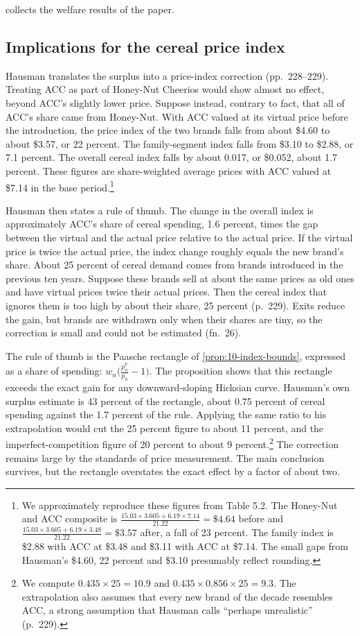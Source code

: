  collects the welfare results of the paper.

\subsection{Implications for the cereal price index}\label{sec:10-hausman-index}

Hausman translates the surplus into a price-index correction (pp.~228--229). Treating ACC as part of
Honey-Nut Cheerios would show almost no effect, beyond ACC's slightly lower price. Suppose instead, contrary
to fact, that all of ACC's share came from Honey-Nut. With ACC valued at its virtual price before
the introduction, the price index of the two brands falls from about \$4.60 to about \$3.57, or 22 percent. The
family-segment index falls from \$3.10 to \$2.88, or 7.1 percent. The overall cereal index falls by about
0.017, or \$0.052, about 1.7 percent. These figures are share-weighted average prices with ACC valued at
\$7.14 in the base period.\footnote{We approximately reproduce these figures from Table 5.2. The Honey-Nut and
ACC composite is $\frac{15.03 \times 3.605 + 6.19 \times 7.14}{21.22} = \$4.64$ before and
$\frac{15.03 \times 3.605 + 6.19 \times 3.48}{21.22} = \$3.57$ after, a fall of 23 percent. The family index is
\$2.88 with ACC at \$3.48 and \$3.11 with ACC at \$7.14. The small gaps from Hausman's \$4.60, 22 percent and
\$3.10 presumably reflect rounding.}

Hausman then states a rule of thumb. The change in the overall index is approximately ACC's share of cereal
spending, 1.6 percent, times the gap between the virtual and the actual price relative to the actual price.
If the virtual price is twice the actual price, the index change roughly equals the new brand's share. About
25 percent of cereal demand comes from brands introduced in the previous ten years. Suppose these brands sell
at about the same prices as old ones and have virtual prices twice their actual prices. Then the cereal index
that ignores them is too high by about their share, 25 percent (p.~229). Exits reduce the gain, but brands
are withdrawn only when their shares are tiny, so the correction is small and could not be estimated
(fn.~26).

The rule of thumb is the Paasche rectangle of \cref{prop:10-index-bounds}, expressed as a share of spending:
$w_n\bigl(\frac{p_n^V}{p_n} - 1\bigr)$. The proposition shows that this rectangle exceeds the exact gain for
any downward-sloping Hicksian curve. Hausman's own surplus estimate is 43 percent of the rectangle, about
0.75 percent of cereal spending against the 1.7 percent of the rule. Applying the same ratio to his
extrapolation would cut the 25 percent figure to about 11 percent, and the imperfect-competition figure of
20 percent to about 9 percent.\footnote{We compute $0.435 \times 25 = 10.9$ and
$0.435 \times 0.856 \times 25 = 9.3$. The extrapolation also assumes that every new brand of the decade
resembles ACC, a strong assumption that Hausman calls ``perhaps unrealistic'' (p.~229).} The correction
remains large by the standards of price measurement. The main conclusion survives, but the rectangle
overstates the exact effect by a factor of about two.


